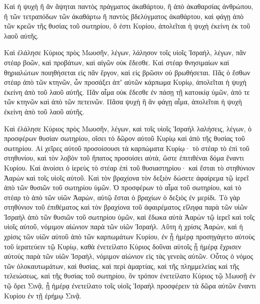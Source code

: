 {Καὶ ἡ ψυχὴ ἣ ἂν ἅψηται παντὸς πράγματος ἀκαθάρτου, ἢ ἀπὸ ἀκαθαρσίας ἀνθρώπου, ἢ τῶν τετραπόδων τῶν ἀκαθάρτω ἢ παντὸς βδελύγματος ἀκαθάρτου, καὶ φάγῃ ἀπὸ τῶν κρεῶν τῆς θυσίας τοῦ σωτηρίου, ὅ ἐστι Κυρίου, ἀπολεῖται ἡ ψυχὴ ἐκείνη ἐκ τοῦ λαοῦ αὐτῆς.
\par }{\PP {}Καὶ ἐλάλησε Κύριος πρὸς Μωυσῆν, λέγων,
λάλησον τοῖς υἱοῖς Ἰσραὴλ, λέγων, πᾶν στέαρ βοῶν, καὶ προβάτων, καὶ αἰγῶν οὐκ ἔδεσθε.
Καὶ στέαρ θνησιμαίων καὶ θηριαλώτων ποιηθήσεται εἰς πᾶν ἔργον, καὶ εἰς βρῶσιν οὐ βρωθήσεται.
Πᾶς ὁ ἔσθων στέαρ ἀπὸ τῶν κτηνῶν, ὧν προσάξει ἀπʼ αὐτῶν κάρπωμα Κυρίῳ, ἀπολεῖται ἡ ψυχὴ ἐκείνη ἀπὸ τοῦ λαοῦ αὐτῆς.
Πᾶν αἷμα οὐκ ἔδεσθε ἐν πάσῃ τῇ κατοικίᾳ ὑμῶν, ἀπό τε τῶν κτηνῶν καὶ ἀπὸ τῶν πετεινῶν.
Πᾶσα ψυχὴ ἣ ἂν φάγῃ αἷμα, ἀπολεῖται ἡ ψυχὴ ἐκείνη ἀπὸ τοῦ λαοῦ αὐτῆς.
\par }{\PP {}Καὶ ἐλάλησε Κύριος πρὸς Μωυσῆν, λέγων,
καὶ τοῖς υἱοῖς Ἰσραὴλ λαλήσεις, λέγων, ὁ προσφέρων θυσίαν σωτηρίου, οἴσει τὸ δῶρον αὐτοῦ Κυρίῳ καὶ ἀπὸ τῆς θυσίας τοῦ σωτηρίου.
Αἱ χεῖρες αὐτοῦ προσοίσουσι τὰ καρπώματα Κυρίῳ· τὸ στέαρ τὸ ἐπὶ τοῦ στηθυνίου, καὶ τὸν λοβὸν τοῦ ἥπατος προσοίσει αὐτὰ, ὥστε ἐπιτιθέναι δόμα ἔναντι Κυρίου.
Καὶ ἀνοίσει ὁ ἱερεὺς τὸ στέαρ ἐπὶ τοῦ θυσιαστηρίου· καὶ ἔσται τὸ στηθύνιον Ἀαρὼν καὶ τοῖς υἱοῖς αὐτοῦ.
Καὶ τὸν βραχίονα τὸν δεξιὸν δώσετε ἀφαίρεμα τῷ ἱερεῖ ἀπὸ τῶν θυσιῶν τοῦ σωτηρίου ὑμῶν.
Ὁ προσφέρων τὸ αἷμα τοῦ σωτηρίου, καὶ τὸ στέαρ τὸ ἀπὸ τῶν υἱῶν Ἀαρὼν, αὐτῷ ἔσται ὁ βραχίων ὁ δεξιὸς ἐν μερίδι.
Τὸ γὰρ στηθύνιον τοῦ ἐπιθέματος καὶ τὸν βραχίονα τοῦ ἀφαιρέματος εἴληφα παρὰ τῶν υἱῶν Ἰσραὴλ ἀπὸ τῶν θυσιῶν τοῦ σωτηρίου ὑμῶν, καὶ ἔδωκα αὐτὰ Ἀαρὼν τῷ ἱερεῖ καὶ τοῖς υἱοῖς αὐτοῦ, νόμιμον αἰώνιον παρὰ τῶν υἱῶν Ἰσραήλ.
Αὕτη ἡ χρίσις Ἀαρὼν, καὶ ἡ χρίσις τῶν υἱῶν αὐτοῦ ἀπὸ τῶν καρπωμάτων Κυρίου, ἐν ᾗ ἡμέρᾳ προσηγάγετο αὐτοὺς τοῦ ἱερατεύειν τῷ Κυρίῳ,
καθὰ ἐνετείλατο Κύριος δοῦναι αὐτοῖς ᾗ ἡμέρᾳ ἔχρισεν αὐτοὺς παρὰ τῶν υἱῶν Ἰσραὴλ, νόμιμον αἰώνιον εἰς τὰς γενεὰς αὐτῶν.
Οὗτος ὁ νόμος τῶν ὁλοκαυτωμάτων, καὶ θυσίας, καὶ περὶ ἁμαρτίας, καὶ τῆς πλημμελείας καὶ τῆς τελειώσεως, καὶ τῆς θυσίας τοῦ σωτηρίου,
ὃν τρόπον ἐνετείλατο Κύριος τῷ Μωυσῇ ἐν τῷ ὄρει Σινᾷ, ᾗ ἡμέρᾳ ἐνετείλατο τοῖς υἱοῖς Ἰσραὴλ προσφέρειν τὰ δῶρα αὐτῶν ἔναντι Κυρίου ἐν τῇ ἐρήμῳ Σινᾷ.

}
